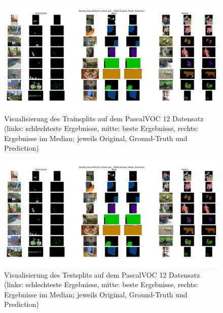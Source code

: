 \begin{figure}[H]
\centering
\includegraphics[height=0.35\textheight, width=\textwidth]{Pictures/nnUnet/Praxis/Task204-Pascal-VOC12-achtel-testsplit/Vis-Train.png}
\caption{Visualisierung des Trainsplits auf dem PascalVOC 12 \cite{PascalVOCDatensatz} Datensatz (links: schlechteste Ergebnisse, mitte: beste Ergebnisse, rechts: Ergebnisse im Median; jeweils Original, Ground-Truth und Prediction)}
\label{pic:Vis-Train_204}
\end{figure}


\begin{figure}[H]
\centering
\includegraphics[height=0.35\textheight, width=\textwidth]{Pictures/nnUnet/Praxis/Task204-Pascal-VOC12-achtel-testsplit/Vis-Train.png}
\caption{Visualisierung des Testsplits auf dem PascalVOC 12 \cite{PascalVOCDatensatz} Datensatz (links: schlechteste Ergebnisse, mitte: beste Ergebnisse, rechts: Ergebnisse im Median; jeweils Original, Ground-Truth und Prediction)}
\label{pic:Vis-Test_204}
\end{figure}

